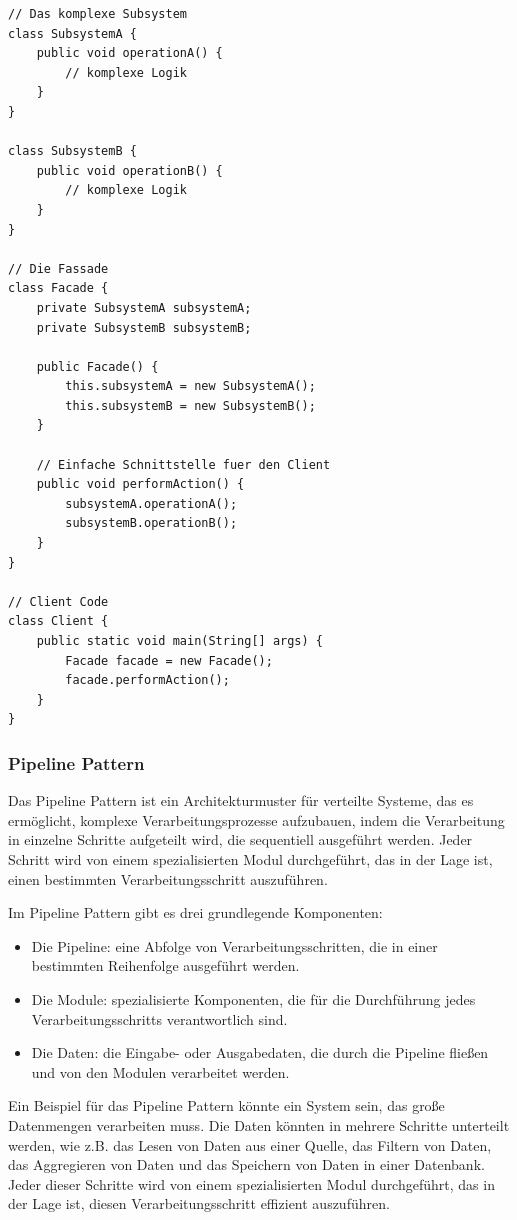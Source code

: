 \noindent\begin{minipage}{\textwidth}
\begin{lstlisting}[caption={Fassade Pattern},captionpos=b,label={lst:fassade}]
// Das komplexe Subsystem
class SubsystemA {
    public void operationA() {
        // komplexe Logik
    }
}

class SubsystemB {
    public void operationB() {
        // komplexe Logik
    }
}

// Die Fassade
class Facade {
    private SubsystemA subsystemA;
    private SubsystemB subsystemB;
    
    public Facade() {
        this.subsystemA = new SubsystemA();
        this.subsystemB = new SubsystemB();
    }
    
    // Einfache Schnittstelle fuer den Client
    public void performAction() {
        subsystemA.operationA();
        subsystemB.operationB();
    }
}

// Client Code
class Client {
    public static void main(String[] args) {
        Facade facade = new Facade();
        facade.performAction();
    }
}
\end{lstlisting}
\end{minipage}


\subsubsection{Pipeline Pattern}
Das Pipeline Pattern ist ein Architekturmuster für verteilte Systeme, das es ermöglicht, komplexe Verarbeitungsprozesse aufzubauen, indem die Verarbeitung in einzelne Schritte aufgeteilt wird, die sequentiell ausgeführt werden. Jeder Schritt wird von einem spezialisierten Modul durchgeführt, das in der Lage ist, einen bestimmten Verarbeitungsschritt auszuführen.

Im Pipeline Pattern gibt es drei grundlegende Komponenten:
\begin{itemize} 
\item Die Pipeline: eine Abfolge von Verarbeitungsschritten, die in einer bestimmten Reihenfolge ausgeführt werden.
\item Die Module: spezialisierte Komponenten, die für die Durchführung jedes Verarbeitungsschritts verantwortlich sind.
\item Die Daten: die Eingabe- oder Ausgabedaten, die durch die Pipeline fließen und von den Modulen verarbeitet werden.
\end{itemize} 
Ein Beispiel für das Pipeline Pattern könnte ein System sein, das große Datenmengen verarbeiten muss. Die Daten könnten in mehrere Schritte unterteilt werden, wie z.B. das Lesen von Daten aus einer Quelle, das Filtern von Daten, das Aggregieren von Daten und das Speichern von Daten in einer Datenbank. Jeder dieser Schritte wird von einem spezialisierten Modul durchgeführt, das in der Lage ist, diesen Verarbeitungsschritt effizient auszuführen.

